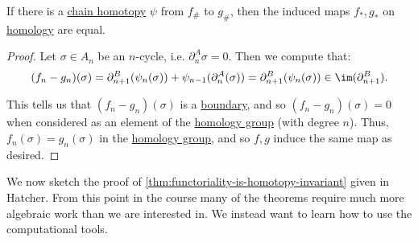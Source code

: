 \begin{theorem}\label{thm:chain-homotopies-on-homology}
	If there is a \hyperref[def:chain-homotopy]{chain homotopy} \(\psi\) from \(f_\#\) to \(g_\#\), then the induced maps
	\(f_\ast, g_\ast\) on \hyperref[def:homology-group]{homology} are equal.
\end{theorem}
\begin{proof}
	Let \(\sigma \in A_n\) be an \(n\)-cycle, i.e. \(\partial_n^A \sigma = 0\). Then we compute that:
	\[
		(f_n - g_n)(\sigma) = \partial_{n + 1}^B(\psi_n(\sigma)) + \psi_{n - 1}(\partial_n^A(\sigma)) = \partial_{n + 1}^B(\psi_n(\sigma)) \in \im (\partial^B_{n + 1}).
	\]

	This tells us that \((f_n - g_n)(\sigma)\) is a \hyperref[def:boundary]{boundary}, and so \((f_n - g_n)(\sigma) = 0\) when considered as an element of
	the \hyperref[def:homology-group]{homology group} (with degree \(n\)).
	Thus, \(f_n(\sigma) = g_n(\sigma)\) in the \hyperref[def:homology-group]{homology group}, and so \(f, g\) induce the same map as desired.
\end{proof}
We now sketch the proof of \autoref{thm:functoriality-is-homotopy-invariant} given in Hatcher\cite{hatcher2002algebraic}. From this point in the course many
of the theorems require much more algebraic work than we are interested in. We instead want to learn how to use the computational tools.

